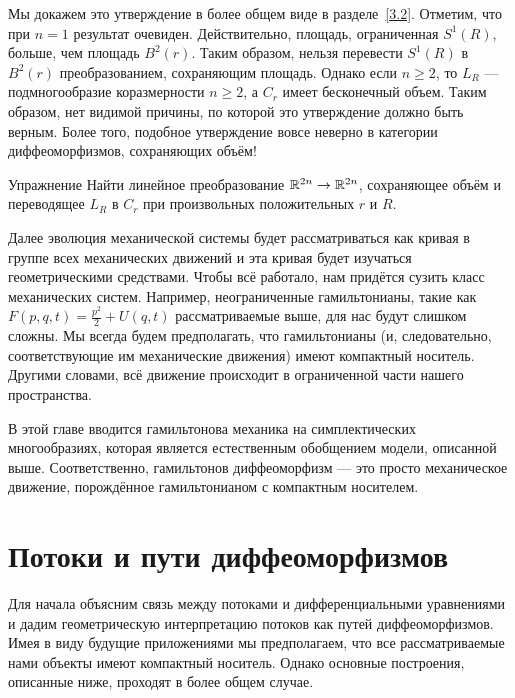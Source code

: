 Мы докажем это утверждение в более общем виде в разделе~\ref{3.2}.
Отметим, что при $n = 1$ результат очевиден.
Действительно, площадь, ограниченная $S^1 (R)$, больше, чем площадь $B^2 (r)$.
Таким образом, нельзя перевести $S^1(R)$ в $B^2(r)$ преобразованием, сохраняющим площадь.
Однако если $n \ge 2$, то $L_R$ — подмногообразие коразмерности $n \ge 2$, а $C_r$ имеет бесконечный объем.
Таким образом, нет видимой причины, по которой это утверждение должно быть верным.
Более того, подобное утверждение вовсе неверно в категории диффеоморфизмов, сохраняющих объём!


\begin{ex*}{Упражнение}
Найти линейное преобразование $\mathbb{R}^{2n} \to \mathbb{R}^{2n}$, сохраняющее объём и переводящее $L_R$ в $C_r$ при произвольных положительных $r$ и $R$.
\end{ex*}

Далее эволюция механической системы будет рассматриваться как кривая в группе всех механических движений и эта кривая будет изучаться геометрическими средствами.
Чтобы всё работало, нам придётся сузить класс механических систем.
Например, неограниченные гамильтонианы, такие как $F(p,q,t) = \tfrac {p^2}2 + U(q,t)$ рассматриваемые выше, для нас будут слишком сложны.
Мы всегда будем предполагать, что гамильтонианы (и, следовательно, соответствующие им механические движения) имеют компактный носитель.
Другими словами, всё движение происходит в ограниченной части нашего пространства.

В этой главе вводится гамильтонова механика на симплектических многообразиях, которая является естественным обобщением модели, описанной выше.
Соответственно, гамильтонов диффеоморфизм — это просто механическое движение, порождённое гамильтонианом с компактным носителем. 

\section{Потоки и пути диффеоморфизмов}

Для начала объясним связь между потоками и дифференциальными уравнениями и дадим геометрическую интерпретацию потоков как путей диффеоморфизмов.
Имея в виду будущие приложениями мы предполагаем, что все рассматриваемые нами объекты имеют компактный носитель.
Однако основные построения, описанные ниже, проходят в более общем случае.

